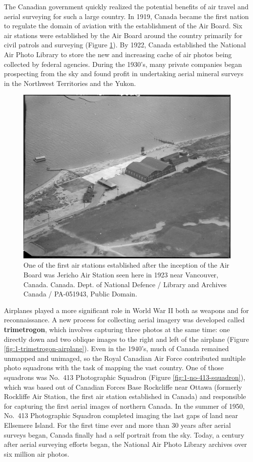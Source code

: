 \documentclass[
]{book}
\begin{document}
The Canadian government quickly realized the potential benefits of air travel and aerial surveying for such a large country. In 1919, Canada became the first nation to regulate the domain of aviation with the establishment of the Air Board. Six air stations were established by the Air Board around the country primarily for civil patrols and surveying (Figure \ref{fig:1-jericho-air-station}). By 1922, Canada established the National Air Photo Library to store the new and increasing cache of air photos being collected by federal agencies. During the 1930's, many private companies began prospecting from the sky and found profit in undertaking aerial mineral surveys in the Northwest Territories and the Yukon.

\begin{figure}
\includegraphics[width=0.75\linewidth]{images/01-jericho-air-station} \caption{One of the first air stations established after the inception of the Air Board was Jericho Air Station seen here in 1923 near Vancouver, Canada. Canada. Dept. of National Defence / Library and Archives Canada / PA-051943, Public Domain.}\label{fig:1-jericho-air-station}
\end{figure}

Airplanes played a more significant role in World War II both as weapons and for reconnaissance. A new process for collecting aerial imagery was developed called \textbf{trimetrogon}, which involves capturing three photos at the same time: one directly down and two oblique images to the right and left of the airplane (Figure \ref{fig:1-trimetrogon-airplane}). Even in the 1940's, much of Canada remained unmapped and unimaged, so the Royal Canadian Air Force contributed multiple photo squadrons with the task of mapping the vast country. One of those squadrons was No.~413 Photographic Squadron (Figure \ref{fig:1-no-413-squadron}), which was based out of Canadian Forces Base Rockcliffe near Ottawa (formerly Rockliffe Air Station, the first air station established in Canada) and responsible for capturing the first aerial images of northern Canada. In the summer of 1950, No.~413 Photographic Squadron completed imaging the last gaps of land near Ellsemere Island. For the first time ever and more than 30 years after aerial surveys began, Canada finally had a self portrait from the sky. Today, a century after aerial surveying efforts began, the National Air Photo Library archives over six million air photos.
\end{document}
